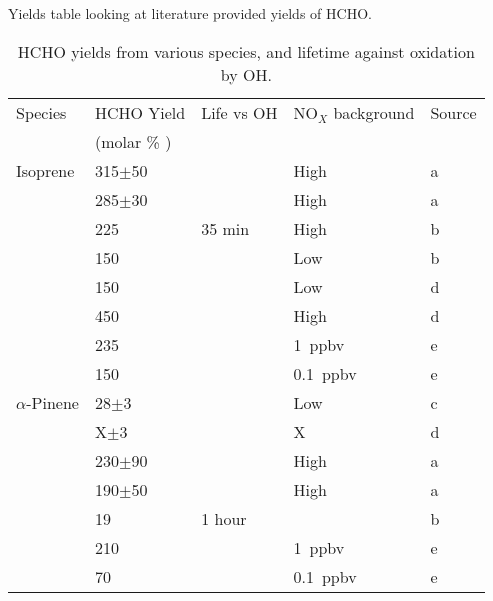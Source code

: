     Yields table looking at literature provided yields of HCHO.
    
    \begin{table} \begin{threeparttable}
      \caption{ HCHO yields from various species, and lifetime against oxidation by OH. }
      \begin{tabular}{  l  l  l  l  l  }
      	\toprule
      	Species    & HCHO Yield      & Life vs OH & NO$_X$ background & Source	\\
                      & (molar \% )        &               &                          &          \\
      	\midrule 
      	Isoprene   & 315$\pm$50      &              & High           & a        \\ 
      			          & 285$\pm$30      &        & High               & a        \\ 
      			          & 225             & 35 min & High               & b        \\ %
      			          & 150             &            & Low                & b        \\ %
      			          & 150             &            & Low                & d        \\
      			          & 450             &            & High               & d        \\
                      & 235             &            & 1~ppbv              & e        \\
                      & 150             &            & 0.1~ppbv              & e        \\
	$\alpha$-Pinene   & 28$\pm$3        &        & Low                & c        \\ 
      			          & X$\pm$3         &        & X                  & d        \\ 
      			          & 230$\pm$90      &        & High        & a        \\ 
      			          & 190$\pm$50      &        & High        & a        \\ 
      			          & 19                & 1 hour &              & b        \\ %
                      & 210               &          & 1~ppbv              & e        \\
                      & 70                &          & 0.1~ppbv              & e        \\

\end{tabular}
\end{threeparttable}
\end{table}
